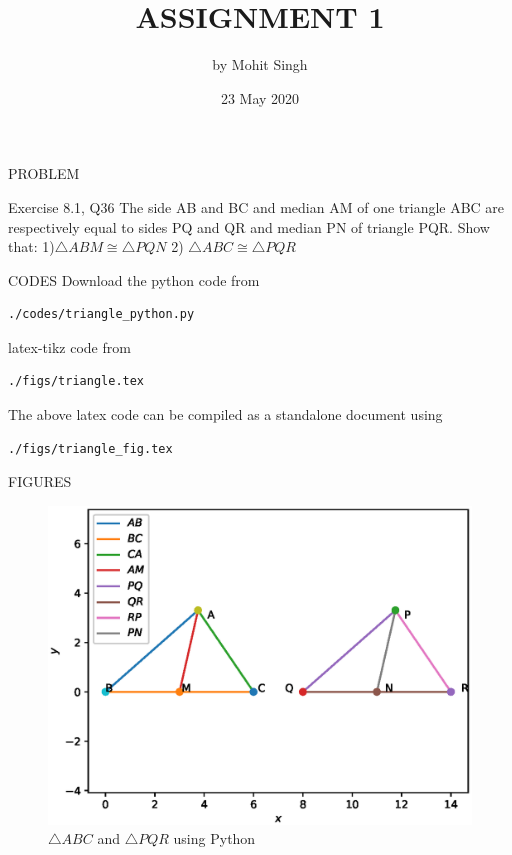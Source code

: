 \documentclass[11pt]{beamer}
\title{ASSIGNMENT 1}
\author{by Mohit Singh}
\institute{IIEST, Shibpur}
\date{23 May 2020}
\begin{document}
\maketitle
\begin{frame}{PROBLEM}
\begin{block}{Exercise 8.1, Q36}
The side AB and BC and median AM of one triangle ABC are respectively equal to sides PQ and QR and median PN of triangle PQR. Show that:
\newline
\newline
{1)$\triangle  ABM  \cong   \triangle  PQN $}
\newline
{2) $\triangle  ABC  \cong   \triangle  PQR $}
\end{block}

\end{frame}

\begin{frame}[containsverbatim]{CODES}
Download the python code from
\begin{lstlisting}
./codes/triangle_python.py
\end{lstlisting}
latex-tikz code from
\begin{lstlisting}
./figs/triangle.tex
\end{lstlisting}
The above latex code can be compiled as a standalone document using
\begin{lstlisting}
./figs/triangle_fig.tex
\end{lstlisting} 
\end{frame}

\begin{frame}{FIGURES}
\begin{figure}
\includegraphics[scale=0.5]{Figure_1.eps}
\caption{$\triangle ABC$ and $\triangle PQR$ using Python}
\end{figure}
\end{frame}
\end{document}
